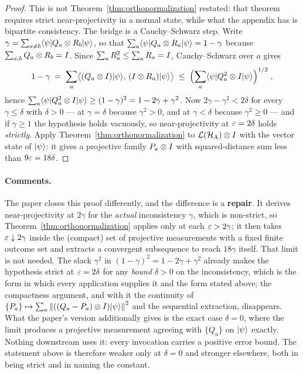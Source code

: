 \begin{proof}
This is not Theorem~\ref{thm:orthonormalization} restated: that theorem requires strict
near-projectivity in a normal state, while what the appendix has is
bipartite consistency. The bridge is a Cauchy--Schwarz step. Write
$\gamma = \sum_{a \neq b} \langle\psi| Q_a \otimes R_b |\psi\rangle$, so that
$\sum_a \langle\psi| Q_a \otimes R_a |\psi\rangle = 1 - \gamma$ because
$\sum_{a,b} Q_a \otimes R_b = I$. Since $\sum_a R_a^2 \leq \sum_a R_a = I$, Cauchy--Schwarz
over $a$ gives
\begin{equation*}
  1 - \gamma \;=\; \sum_a \bigl\langle (Q_a \otimes I)|\psi\rangle,\,
    (I \otimes R_a)|\psi\rangle \bigr\rangle
  \;\leq\; \Bigl(\sum_a \langle\psi| Q_a^2 \otimes I |\psi\rangle\Bigr)^{1/2}\;,
\end{equation*}
hence $\sum_a \langle\psi| Q_a^2 \otimes I |\psi\rangle \geq (1 - \gamma)^2 = 1 - 2\gamma + \gamma^2$.
Now $2\gamma - \gamma^2 < 2\delta$ for every $\gamma \leq \delta$ with $\delta > 0$ --- at
$\gamma = \delta$ because $\gamma^2 > 0$, and at $\gamma < \delta$ because $\gamma^2 \geq 0$ ---
and if $\gamma \geq 1$ the hypothesis holds vacuously, so near-projectivity at $\varepsilon = 2\delta$
holds \emph{strictly}. Apply Theorem~\ref{thm:orthonormalization} to
$\mathcal{L}(\mathcal{H}_{\textsc{A}})\otimes I$ with the vector state of $|\psi\rangle$: it gives a projective family
$P_a \otimes I$ with squared-distance sum less than $9\varepsilon = 18\delta$.
\end{proof}

\paragraph{Comments.} The paper closes this proof differently, and the difference is a
\textbf{repair}. It derives near-projectivity at $2\gamma$ for the \emph{actual} inconsistency
$\gamma$, which is non-strict, so Theorem~\ref{thm:orthonormalization} applies only at each
$\varepsilon > 2\gamma$; it then takes $\varepsilon \downarrow 2\gamma$ inside the (compact) set of projective
measurements with a fixed finite outcome set and extracts a convergent subsequence to reach
$18\gamma$ itself. That limit is not needed. The slack $\gamma^2$ in
$(1-\gamma)^2 = 1 - 2\gamma + \gamma^2$ already makes the hypothesis strict at $\varepsilon = 2\delta$
for any \emph{bound} $\delta > 0$ on the inconsistency, which is the form in which every
application supplies it and the form stated above; the compactness argument, and with it the
continuity of $\{P_a\} \mapsto \sum_a \left\| {((Q_a - P_a)\otimes I)|\psi\rangle} \right\|^2$ and the
sequential extraction, disappears. What the paper's version additionally gives is the exact
case $\delta = 0$, where the limit produces a projective measurement agreeing with $\{Q_a\}$ on
$|\psi\rangle$ exactly. Nothing downstream uses it: every invocation carries a positive error
bound. The statement above is therefore weaker only at $\delta = 0$ and stronger elsewhere,
both in being strict and in naming the constant.

